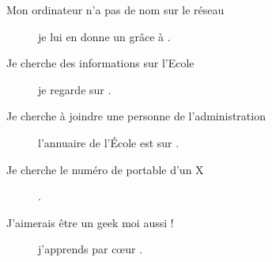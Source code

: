 \begin{description}
\item[Mon ordinateur n'a pas de nom sur le réseau] je lui en donne un gr\^ace \`a  .

\item[Je cherche des informations sur l'Ecole] je regarde sur .

\item[Je cherche à joindre une personne de l'administration] l'annuaire de l'École est sur \linebreak{} .

\item[Je cherche le numéro de portable d'un X] .

\item[J'aimerais être un geek moi aussi !] j'apprends par c\oe ur .

\end{description}
